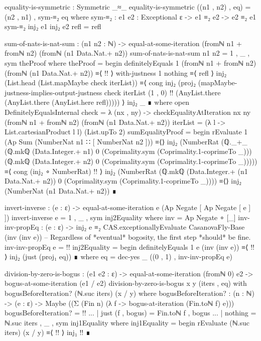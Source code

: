 \documentclass{report}
\begin{document}
\begin{code}
  equality-is-symmetric : Symmetric _≈_
  equality-is-symmetric ((n1 , n2) , eq) = (n2 , n1) , sym-≡₂ eq
    where
    sym-≡₂ : {e1 e2 : Exceptional ε} -> e1 ≡₂ e2 -> e2 ≡₂ e1
    sym-≡₂ {inj₂ e1} {inj₂ e2} refl = refl

  sum-of-nats-is-nat-sum :
    (n1 n2 : ℕ) ->
    equal-at-some-iteration (fromℕ n1 + fromℕ n2) (fromℕ (n1 Data.Nat.+ n2))
  sum-of-nats-is-nat-sum n1 n2 = 1 , _ , sym theProof
    where
    theProof = begin
      definitelyEquals 1 (fromℕ n1 + fromℕ n2) (fromℕ (n1 Data.Nat.+ n2))
        ≡⟨ {!!} ⟩
      with-justness {1} nothing
        ≡⟨ refl ⟩
      inj₂ (List.head (List.mapMaybe check iterList))
        ≡⟨ cong inj₂
                (proj₂ (mapMaybe-justness-implies-output-justness
                         check
                         iterList
                         (1 , 0)
                         {!!}
                         (AnyList.there (AnyList.there (AnyList.here refl))))) ⟩
      inj₂ _ ∎
        where
        open DefinitelyEqualsInternal
        check = λ (nx , ny) ->
          checkEqualityAtIteration nx ny (fromℕ n1 + fromℕ n2)
                                         (fromℕ (n1 Data.Nat.+ n2))
        iterList = (λ l -> List.cartesianProduct l l) (List.upTo 2)
        sumEqualityProof = begin
          rEvaluate 1 (Ap Sum (NumberNat n1 ∷ [ NumberNat n2 ]))
            ≡⟨⟩
          inj₂ (NumberRat (ℚ._+_ (ℚ.mkℚ (Data.Integer.+ n1) 0
                                        (Coprimality.sym (Coprimality.1-coprimeTo _)))
                                 (ℚ.mkℚ (Data.Integer.+ n2) 0
                                        (Coprimality.sym (Coprimality.1-coprimeTo _)))))
            ≡⟨ cong (inj₂ ∘ NumberRat) {!!} ⟩
          inj₂ (NumberRat (ℚ.mkℚ (Data.Integer.+ (n1 Data.Nat.+ n2)) 0
                                 (Coprimality.sym (Coprimality.1-coprimeTo _))))
            ≡⟨⟩
          inj₂ (NumberNat (n1 Data.Nat.+ n2)) ∎

  invert-inverse : (e : ε) -> equal-at-some-iteration e (Ap Negate [ Ap Negate [ e ] ])
  invert-inverse e = 1 , _ , sym inj2Equality
    where
    inv = Ap Negate ∘ [_]
    inv-inv-propEq :
      (e : ε) ->
      inj₂ e ≡₂ CAS.exceptionallyEvaluate CasanovaFly-Base (inv (inv e))
    -- Regardless of *eventual* bogosity, the first step *should* be fine.
    inv-inv-propEq e = {!!}
    inj2Equality = begin
      definitelyEquals 1 e (inv (inv e))
        ≡⟨ {!!} ⟩
      inj₂ (just (proj₁ eq)) ∎
      where
      eq = dec-yes _ ((0 , 1) , inv-inv-propEq e)

  division-by-zero-is-bogus :
    (e1 e2 : ε) ->
    equal-at-some-iteration (fromℕ 0) e2 ->
    bogus-at-some-iteration (e1 / e2)
  division-by-zero-is-bogus x y (iters , eq) with bogusBeforeIteration? (ℕ.suc iters) (x / y)
    where
    bogusBeforeIteration? :
      (n : ℕ) ->
      (e : ε) ->
      Maybe ((Σ (Fin n) (λ f -> bogus-at-iteration (Fin.toℕ f) e)))
    bogusBeforeIteration? = {!!}
  ... | just (f , bogus) = Fin.toℕ f , bogus
  ... | nothing = ℕ.suc iters , _ , sym inj1Equality
    where
    inj1Equality = begin
      rEvaluate (ℕ.suc iters) (x / y)
        ≡⟨ {!!} ⟩
      inj₁ {!!} ∎


\end{code}
\end{document}
